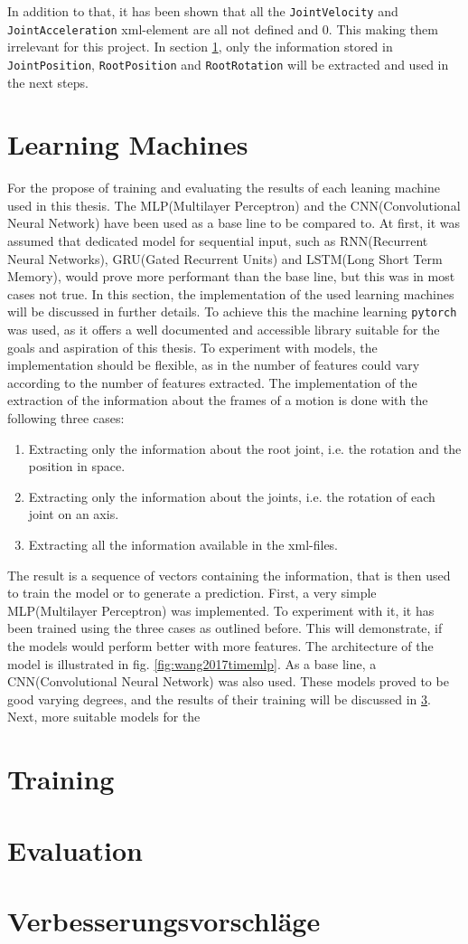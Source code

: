 In addition to that, it has been shown that all the \texttt{JointVelocity} and \texttt{JointAcceleration} xml-element are all not defined and 0. This making them irrelevant for this project. In section \ref{section:leaningmachines}, only the information stored in \texttt{JointPosition}, \texttt{RootPosition} and \texttt{RootRotation} will be extracted and used in the next steps.
\section{Learning Machines}
\label{section:leaningmachines}
For the propose of training and evaluating the results of each leaning machine used in this thesis. The MLP(Multilayer Perceptron) and the CNN(Convolutional Neural Network) have been used as a base line to be compared to. At first, it was assumed that dedicated model for sequential input, such as RNN(Recurrent Neural Networks), GRU(Gated Recurrent Units) and LSTM(Long Short Term Memory), would prove more performant than the base line, but this was in most cases not true. In this section, the implementation of the used learning machines will be discussed in further details. To achieve this the machine learning \texttt{pytorch} was used, as it offers a well documented and accessible library suitable for the goals and aspiration of this thesis. To experiment with models, the implementation should be flexible, as in the number of features could vary according to the number of features extracted. The implementation of the extraction of the information about the frames of a motion is done with the following three cases:
\begin{enumerate}
	\item Extracting only the information about the root joint, i.e. the rotation and the position in space.
	\item Extracting only the information about the joints, i.e. the rotation of each joint on an axis.
	\item Extracting all the information available in the xml-files.
\end{enumerate}
The result is a sequence of vectors containing the information, that is then used to train the model or to generate a prediction.\newline
First, a very simple MLP(Multilayer Perceptron) was implemented. To experiment with it, it has been trained using the three cases as outlined before. This will demonstrate, if the models would perform better with more features. The architecture of the model is illustrated in fig. \ref{fig:wang2017timemlp}. As a base line, a CNN(Convolutional Neural Network) was also used. These models proved to be good varying degrees, and the results of their training will be discussed in \ref{sec:evaluation}. Next, more suitable models for the 
\section{Training}\label{section:training}
\section{Evaluation}\label{sec:evaluation}
\section{Verbesserungsvorschläge}
